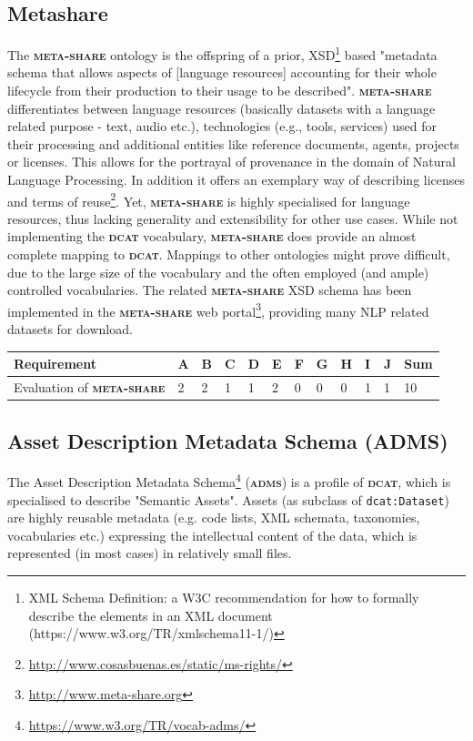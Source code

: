 \documentclass[a4paper,english,twoside,BCOR1.5cm,headsepline,DIV12,appendixprefix,final,12pt]{scrbook}
\newcommand{\dcat}{{\scshape\bfseries dcat}\xspace}
\newcommand{\adms}{{\scshape\bfseries adms}\xspace}
\newcommand{\metashare}{{\scshape\bfseries meta-share}\xspace}
\newcommand{\prop}[1]{{{\texttt{#1}}}}
\newcommand\footnoteurl[1]{\footnote{\scriptsize\url{#1}}}
\begin{document}
\subsection{Metashare}
\label{sec:metashare}
The \metashare ontology\cite{mccrae_2015_OWLmetashare} is the offspring of a prior, XSD\footnote{XML Schema Definition: a W3C recommendation for how to formally describe the elements in an XML document (https://www.w3.org/TR/xmlschema11-1/)} based "metadata schema that allows aspects of [language resources] accounting for their whole lifecycle from their production to their usage to be described"\cite{mccrae_2015_OWLmetashare}.
\metashare differentiates between language resources (basically datasets with a language related purpose - text, audio etc.), technologies (e.g., tools, services) used for their processing and additional entities like reference documents, agents, projects or licenses. This allows for the portrayal of provenance in the domain of Natural Language Processing.
In addition it offers an exemplary way of describing licenses and terms of reuse\footnoteurl{http://www.cosasbuenas.es/static/ms-rights/}. Yet, \metashare is highly specialised for language resources, thus lacking generality and extensibility for other use cases. While not implementing the \dcat vocabulary, \metashare does provide an almost complete mapping to \dcat. Mappings to other ontologies might prove difficult, due to the large size of the vocabulary and the often employed (and ample) controlled vocabularies. The related \metashare XSD schema has been implemented in the \metashare web portal\footnoteurl{http://www.meta-share.org}, providing many NLP related datasets for download.

\begin{table}[!htbp]
    \centering
    \begin{tabular}{|l|l|l|l|l|l|l|l|l|l|l|l|}
        \hline
        Requirement & A & B & C & D & E & F & G & H & I & J & Sum \\
        \hline
        Evaluation of \metashare & 2 & 2 & 1 & 1 & 2 & 0 & 0 & 0 & 1 & 1 & 10 \\
        \hline
    \end{tabular}
    \label{tab:evalmetashare}
\end{table}

\subsection{Asset Description Metadata Schema (ADMS)}
\label{sec:adms}
The Asset Description Metadata Schema\footnoteurl{https://www.w3.org/TR/vocab-adms/} (\adms) is a profile of \dcat, which is specialised to describe "Semantic Assets".
Assets (as subclass of \prop{dcat:Dataset}) are highly reusable metadata (e.g. code lists, XML schemata, taxonomies, vocabularies etc.) expressing the intellectual content of the data, which is represented (in most cases) in relatively small files. 
\end{document}
